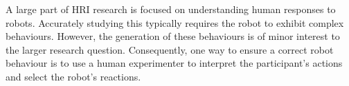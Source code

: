 \documentclass[manuscript, review, anonymous]{acmart}
\newcommand{\ES}[1]{\added[id=ES]{#1}}
\begin{document}
A large part of HRI research is focused on understanding human responses to
robots. Accurately studying this typically requires the robot to exhibit complex
behaviours. However, the generation of these behaviours is of minor interest to
the larger research question. Consequently, one way to ensure a correct robot 
behaviour is to use a human experimenter to
interpret the participant's actions and select the robot's reactions.






\end{document}
